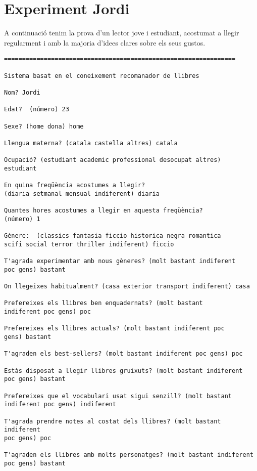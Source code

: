 
\section{Experiment Jordi}

A continuació tenim la prova d'un lector jove i estudiant, acostumat a llegir regularment i amb la majoria d'idees clares sobre els seus gustos.

\begin{verbatim}
================================================================

Sistema basat en el coneixement recomanador de llibres

Nom? Jordi

Edat?  (número) 23

Sexe? (home dona) home

Llengua materna? (catala castella altres) catala

Ocupació? (estudiant academic professional desocupat altres)
estudiant

En quina freqüència acostumes a llegir?
(diaria setmanal mensual indiferent) diaria 

Quantes hores acostumes a llegir en aquesta freqüència?
(número) 1

Gènere:  (classics fantasia ficcio historica negra romantica
scifi social terror thriller indiferent) ficcio

T'agrada experimentar amb nous gèneres? (molt bastant indiferent
poc gens) bastant

On llegeixes habitualment? (casa exterior transport indiferent) casa

Prefereixes els llibres ben enquadernats? (molt bastant
indiferent poc gens) poc

Prefereixes els llibres actuals? (molt bastant indiferent poc
gens) bastant

T'agraden els best-sellers? (molt bastant indiferent poc gens) poc

Estàs disposat a llegir llibres gruixuts? (molt bastant indiferent
poc gens) bastant

Prefereixes que el vocabulari usat sigui senzill? (molt bastant
indiferent poc gens) indiferent

T'agrada prendre notes al costat dels llibres? (molt bastant indiferent
poc gens) poc

T'agraden els llibres amb molts personatges? (molt bastant indiferent
poc gens) bastant


\end{verbatim}

